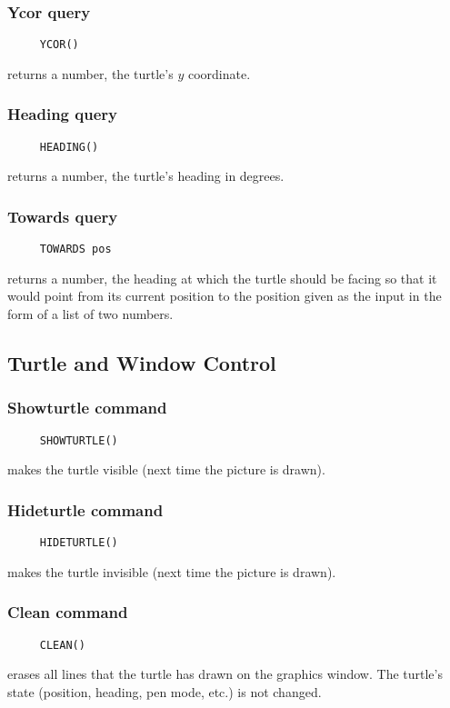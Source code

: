 \subsubsection*{Ycor query}
\begin{verbatim}
     YCOR()
\end{verbatim}
returns a number, the turtle's $y$ coordinate.

\subsubsection*{Heading query}
\begin{verbatim}
     HEADING()
\end{verbatim}
returns a number, the turtle's heading in degrees.

\subsubsection*{Towards query}
\begin{verbatim}
     TOWARDS pos
\end{verbatim}
returns a number, the heading at which the turtle should be facing so
that it would point from its current position to the position given as
the input in the form of a list of two numbers.


\subsection{Turtle and Window Control}
\label{logoturtle:TWC}

\subsubsection*{Showturtle command}
\begin{verbatim}
     SHOWTURTLE()
\end{verbatim}
\label{logoturtle:showturtle}
makes the turtle visible (next time the picture is drawn).

\subsubsection*{Hideturtle command}
\begin{verbatim}
     HIDETURTLE()
\end{verbatim}
\label{logoturtle:hideturtle}
makes the turtle invisible (next time the picture is drawn).

\subsubsection*{Clean command}
\begin{verbatim}
     CLEAN()
\end{verbatim}
erases all lines that the turtle has drawn on the graphics window.
The turtle's state (position, heading, pen mode, etc.) is not changed.


